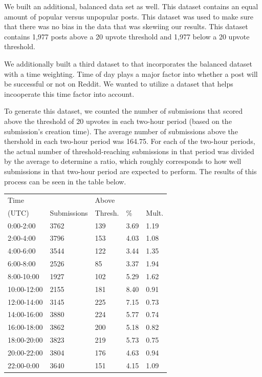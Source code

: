 \documentclass{acm_proc_article-sp}
\begin{document}
We built an additional, balanced data set as well. This dataset contains an equal amount of popular versus unpopular posts. This dataset was used to make sure that there was no bias in the data that was skewiing our results. This dataset contains 1,977 posts above a 20 upvote threshold and 1,977 below a 20 upvote threshold.

We additionally built a third dataset to that incorporates the balanced dataset with a time weighting. Time of day plays a major factor into whether a post will be successful or not on Reddit. We wanted to utilize a dataset that helps incooperate this time factor into account. 

To generate this dataset, we counted the number of submissions that scored above the threshold of 20 upvotes in each two-hour period
(based on the submission's creation time).  The average number of submissions above the thershold in each two-hour period was 164.75.
For each of the two-hour periods, the actual number of threshold-reaching submissions in that period was divided by the average to
determine a ratio, which roughly corresponds to how well submissions in that two-hour period are expected to perform.  The results
of this process can be seen in the table below.

\begin{table}[h!]
    \begin{tabular}{l|llll}
    Time  &             & Above   &      &       \\
    (UTC) & Submissions & Thresh. & \%   & Mult. \\ \hline
    0:00-2:00        & 3762        & 139             & 3.69 & 1.19       \\
    2:00-4:00        & 3796        & 153             & 4.03 & 1.08       \\
    4:00-6:00        & 3544        & 122             & 3.44 & 1.35       \\
    6:00-8:00        & 2526        & 85              & 3.37 & 1.94       \\
    8:00-10:00       & 1927        & 102             & 5.29 & 1.62       \\
    10:00-12:00      & 2155        & 181             & 8.40 & 0.91       \\
    12:00-14:00      & 3145        & 225             & 7.15 & 0.73       \\
    14:00-16:00      & 3880        & 224             & 5.77 & 0.74       \\
    16:00-18:00      & 3862        & 200             & 5.18 & 0.82       \\
    18:00-20:00      & 3823        & 219             & 5.73 & 0.75       \\
    20:00-22:00      & 3804        & 176             & 4.63 & 0.94       \\
    22:00-0:00       & 3640        & 151             & 4.15 & 1.09       \\
    \end{tabular}
\end{table}
\end{document}
